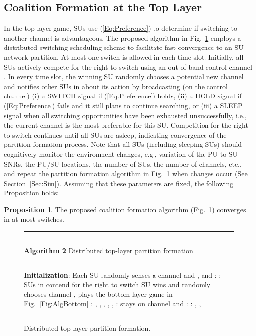 \documentclass[journal,draftclsnofoot,onecolumn]{IEEEtran}
\theoremstyle{definition}
\newtheorem{Prop}{Proposition}
\def\Extra{0.5ex}
\def\Extra{0.5ex}
\begin{document}
\subsection{Coalition Formation at the Top Layer}\label{SubSec:TopSol}
In the top-layer game, SUs use (\ref{Eq:Preference}) to determine if switching to another channel is advantageous. The proposed algorithm in Fig.~\ref{Fig:AlgTop} employs a distributed switching scheduling scheme to facilitate fast convergence to an SU network partition. At most one switch is allowed in each time slot. Initially, all SUs actively compete for the right to switch using an out-of-band control channel \cite{ContrChSurvey}. In every time slot, the winning SU  randomly chooses a potential new channel and notifies other SUs in  about its action by broadcasting (on the control channel) (i) a SWITCH signal if (\ref{Eq:Preference}) holds, (ii) a HOLD signal if (\ref{Eq:Preference}) fails and it still plans to continue searching, or (iii) a SLEEP signal when all switching opportunities have been exhausted unsuccessfully, i.e., the current channel is the most preferable for this SU. Competition for the right to switch continues until all SUs are asleep, indicating convergence of the partition formation process. Note that all SUs (including sleeping SUs) should cognitively monitor the environment changes, e.g., variation of the PU-to-SU SNRs, the PU/SU locations, the number of SUs, the number of channels, etc., and repeat the partition formation algorithm in Fig.~\ref{Fig:AlgTop} when changes occur (See Section~\ref{Sec:Sim}). Assuming that these parameters are fixed, the following Proposition holds:
\begin{Prop}\label{Prop:Converge} The proposed coalition formation algorithm (Fig.~\ref{Fig:AlgTop}) converges in at most  switches.
\end{Prop}


\renewcommand{\algorithmicrequire}{\textbf{Input:}}
\renewcommand{\algorithmicensure}{\textbf{Output:}}
\begin{figure}[!t]
\hrule\hrule\vspace{\Extra}
\textbf{Algorithm 2} Distributed top-layer partition formation
\vspace{\Extra}
\hrule
\begin{algorithmic}[1]
\Require 
\Ensure 
\State \textbf{Initialization}: Each SU  randomly senses a channel 
\State  and , 
\State  and 
\label{Line:While}
\If {}: {}
\EndIf
\If {}:
\State SUs in  contend for the right to switch
\State SU  wins and 
\EndIf
\State  randomly chooses channel 
\State , 
\State  plays the bottom-layer game  in Fig.~\ref{Fig:AlgBottom}\label{Line:Play}
:\label{Line:CheckPrefer}
\State , ,  , 
\State  \State , ,  
\Else :
\State  stays on channel  and 
\If{}: {}
\Else : {, }
\EndIf
\EndIf
{} ,
\EndIf
\EndWhile\label{Line:Converge}
\end{algorithmic}
\hrule
\caption{Distributed top-layer partition formation.}
\label{Fig:AlgTop}
\end{figure}
\end{document}
